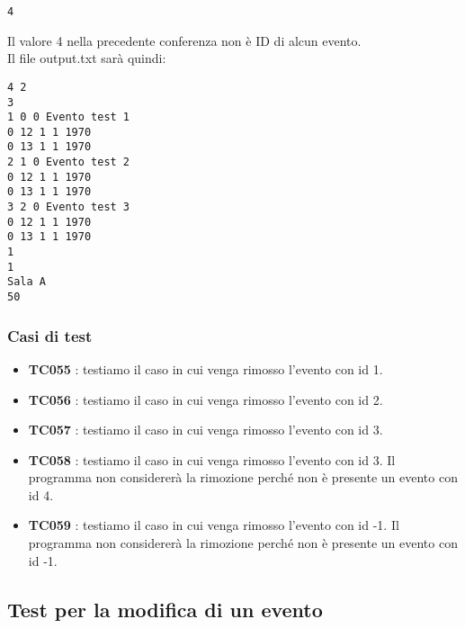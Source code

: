 \documentclass[11pt]{scrartcl} %
\begin{document}
\begin{lstlisting}
4
\end{lstlisting}
Il valore 4 nella precedente conferenza non è ID di alcun evento.\\
Il file output.txt sarà quindi:

\begin{lstlisting}
4 2
3
1 0 0 Evento test 1
0 12 1 1 1970
0 13 1 1 1970
2 1 0 Evento test 2
0 12 1 1 1970
0 13 1 1 1970
3 2 0 Evento test 3
0 12 1 1 1970
0 13 1 1 1970
1
1
Sala A
50
\end{lstlisting}


\subsubsection{Casi di test}
\begin{itemize}

	\item \textbf{TC055} : testiamo il caso in cui venga rimosso l'evento con id 1.

	\item \textbf{TC056} : testiamo il caso in cui venga rimosso l'evento con id 2.

	\item \textbf{TC057} : testiamo il caso in cui venga rimosso l'evento con id 3.

	\item \textbf{TC058} : testiamo il caso in cui venga rimosso l'evento con id 3. Il programma non considererà la rimozione perché non è presente un evento con id 4.

	\item \textbf{TC059} : testiamo il caso in cui venga rimosso l'evento con id -1. Il programma non considererà la rimozione perché non è presente un evento con id -1.

\end{itemize}

\subsection{Test per la modifica di un evento}
\end{document}
